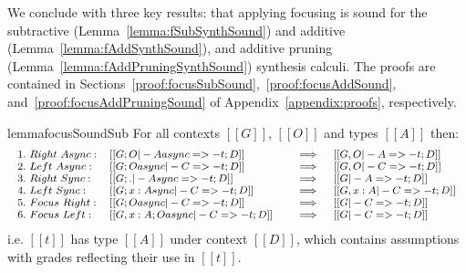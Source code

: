 We conclude with three key results: that applying focusing is sound for the
subtractive (Lemma~\ref{lemma:fSubSynthSound}) and additive
(Lemma~\ref{lemma:fAddSynthSound}), and additive pruning
(Lemma~\ref{lemma:fAddPruningSynthSound}) synthesis calculi. The proofs are
contained in Sections~\ref{proof:focusSubSound},~\ref{proof:focusAddSound},
and~\ref{proof:focusAddPruningSound} of Appendix~\ref{appendix:proofs},
respectively.

\begin{restatable}{lemma}{focusSoundSub}
  \label{lemma:fSubSynthSound}
For all contexts $[[ G ]]$, $[[ O ]]$ and types $[[ A ]]$
then:
\begin{align*}
  {\footnotesize{
\begin{array}{lll}
 1.\ Right\ Async: & [[ G ; O |- A async =>- t ; D ]] \quad &\implies \quad [[ G , O |- A =>- t ; D ]]\\
 2.\ Left\ Async: & [[ G ; O async |- C =>- t ; D ]] \quad &\implies \quad [[ G , O |- C =>- t ; D ]]\\
 3.\ Right\ Sync: & [[ G ; . |- A sync =>- t ; D ]] \quad &\implies \quad [[ G |- A =>- t ; D ]]\\
 4.\ Left\ Sync: & [[ G ; {x : A }sync |- C =>- t ; D ]] \quad &\implies \quad [[ G, x : A |- C =>- t ; D ]]\\
 5.\ Focus\ Right: & [[ G ; O async |- C =>- t ; D ]] \quad &\implies \quad [[ G |- C =>- t ; D ]]\\
 6.\ Focus\ Left: & [[ G, x : A ; O async |- C =>- t ; D ]] \quad &\implies \quad [[ G |- C =>- t ; D ]]
\end{array}
  }}
\end{align*}
i.e. $[[ t ]]$ has type $[[ A ]]$
under context $[[ D ]]$,
which contains assumptions with grades reflecting their use in $[[ t ]]$.
\end{restatable}

